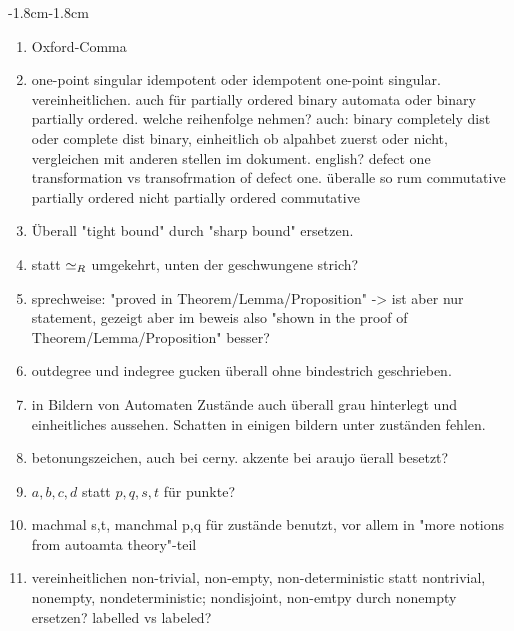 \begin{adjustwidth}{-1.8cm}{-1.8cm}
	
	\footnotesize 
	\begin{enumerate}[itemsep=-5pt]
		
		\item Oxford-Comma	
		
		\item one-point singular idempotent  oder  idempotent one-point singular. vereinheitlichen. auch für partially ordered binary automata oder binary partially ordered. welche reihenfolge nehmen? auch: binary completely dist oder complete dist binary, einheitlich ob alpahbet zuerst oder nicht, vergleichen mit anderen stellen im dokument. english? defect one transformation vs transofrmation of defect one.
		überalle so rum commutative partially ordered nicht partially ordered commutative 
				
		\item Überall "tight bound" durch "sharp bound" ersetzen.
		
		\item statt $\simeq_R$ umgekehrt, unten der geschwungene strich?
		
		\item sprechweise: "proved in Theorem/Lemma/Proposition" -> ist aber nur statement, gezeigt aber im beweis also "shown in the proof of Theorem/Lemma/Proposition" besser?
		
		\item outdegree und indegree gucken überall ohne bindestrich geschrieben.
		
		\item in Bildern von Automaten Zustände auch überall grau hinterlegt und einheitliches aussehen. Schatten in einigen bildern unter zuständen fehlen.		
		
		\item betonungszeichen, auch bei cerny. akzente bei araujo üerall besetzt?			
		
		\item $a,b,c,d$ statt $p,q,s,t$ für punkte?
		
		\item machmal s,t, manchmal p,q für zustände benutzt, vor allem in "more notions from autoamta theory"-teil
		
		\item vereinheitlichen non-trivial, non-empty, non-deterministic statt nontrivial, nonempty, nondeterministic; nondisjoint, non-emtpy durch nonempty ersetzen? labelled vs labeled?
		

\end{enumerate}
\end{adjustwidth}

